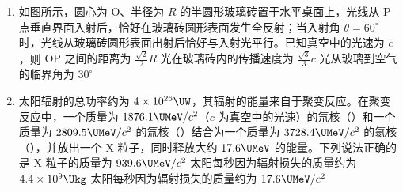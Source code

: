 \documentclass[\gkver]{gaokaozhenti}
\begin{document}
\begin{enumerate}
{B．电容器两极板间电压等于电源电动势 $E$，带电微粒在两极板间处于静止状态，则 $q\frac{E}{d}=mg$，即 $\frac{q}{m}=\frac{dg}{E}=\frac{dg}{\frac{1}{2}Br^{2}\omega}=\frac{2dg}{Br^{2}\omega}$，B 正确；

C．电阻消耗的功率 $P=\frac{E^{2}}{R}=\frac{B^{2}r^{4}\omega^{2}}{4R}$，C 错误；

D．电容器所带的电荷量 $Q=CE=\frac{CBr^{2}\omega}{2}$，D 错误。

故选 B。
}

\item
如图所示，圆心为 O、半径为 $R$ 的半圆形玻璃砖置于水平桌面上，光线从 P 点垂直界面入射后，恰好在玻璃砖圆形表面发生全反射；当入射角 $\theta=60^\circ$ 时，光线从玻璃砖圆形表面出射后恰好与入射光平行。已知真空中的光速为 $c$，则
\onepicture[w=4.15cm]{}
{OP 之间的距离为 $\frac{\sqrt{2}}{2}R$}
{光在玻璃砖内的传播速度为 $\frac{\sqrt{3}}{3}c$}
{光从玻璃到空气的临界角为 $30^\circ$}

\item
太阳辐射的总功率约为 $4\times10^{26}\UW$，其辐射的能量来自于聚变反应。在聚变反应中，一个质量为 $1876.1\UMeV/c^{2}$（$c$ 为真空中的光速）的氘核（）和一个质量为 $2809.5\UMeV/c^{2}$ 的氚核（）结合为一个质量为 $3728.4\UMeV/c^{2}$ 的氦核（），并放出一个 X 粒子，同时释放大约 $17.6\UMeV$ 的能量。下列说法正确的是
{X 粒子的质量为 $939.6\UMeV/c^{2}$}
{太阳每秒因为辐射损失的质量约为 $4.4\times10^{9}\Ukg$}
{太阳每秒因为辐射损失的质量约为 $17.6\UMeV/c^{2}$}
\end{enumerate}
\end{document}
